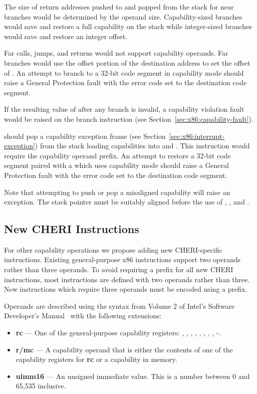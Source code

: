 The size of return addresses pushed to and popped from the
stack for near branches would be determined by the operand size.
Capability-sized branches would save and restore a full capability on
the stack while integer-sized branches would save and restore an
integer offset.

Far calls, jumps, and returns would not support capability operands.
Far branches would use the offset portion of the destination address
to set the offset of \CIP{}.  An attempt to branch to a 32-bit code
segment in capability mode should raise a General Protection fault
with the error code set to the destination code segment.

If the resulting value of \CIP{} after any branch
is invalid, a capability violation fault would be raised on the branch
instruction (see Section~\ref{sec:x86:capability-fault}).

 should pop a capability exception frame (see
Section~\ref{sec:x86:interrupt-exception}) from the stack loading
capabilities into \CIP{} and \CSP{}.  This instruction would require
the capability operand prefix.  An attempt to restore a 32-bit code
segment paired with a \CIP{} which uses capability mode should raise a
General Protection fault with the error code set to the destination
code segment.

Note that attempting to push or pop a misaligned capability will raise
an exception.  The stack pointer must be suitably aligned before the
use of , , and .

\subsection{New CHERI Instructions}

For other capability operations we
propose adding new CHERI-specific instructions.
Existing general-purpose x86 instructions support two operands rather
than three operands.  To avoid requiring a \VEX{} prefix for all new
CHERI instructions, most instructions are defined with two operands
rather than three.  New instructions which require three operands must
be encoded using a \VEX{} prefix.

Operands are described using the syntax from Volume 2 of Intel's
Software Developer's Manual~\cite{intel-sdm-vol2} with the following
extensions:

\begin{itemize}
  \item \textbf{rc} { }---{ } One of the general-purpose capability
    registers: \CAX{}, \CBX{}, \CCX{}, \CDX{}, \CDI{}, \CSI{}, \CBP{},
    \CSP{}, -.

  \item \textbf{r/mc} { }---{ } A capability operand that is either
    the contents of one of the capability registers for \textbf{rc} or
    a capability in memory.

   \item \textbf{uimm16} { }---{ } An unsigned immediate value.  This
     is a number between 0 and 65,535 inclusive.
\end{itemize}

